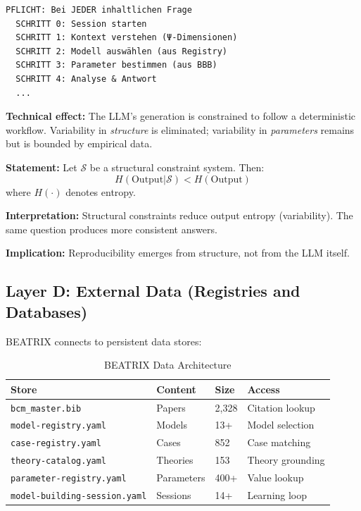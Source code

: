\begin{verbatim}
PFLICHT: Bei JEDER inhaltlichen Frage
  SCHRITT 0: Session starten
  SCHRITT 1: Kontext verstehen (Ψ-Dimensionen)
  SCHRITT 2: Modell auswählen (aus Registry)
  SCHRITT 3: Parameter bestimmen (aus BBB)
  SCHRITT 4: Analyse & Antwort
  ...
\end{verbatim}

\textbf{Technical effect:} The LLM's generation is constrained to follow a deterministic workflow. Variability in \textit{structure} is eliminated; variability in \textit{parameters} remains but is bounded by empirical data.

\begin{tcolorbox}[colback=gray!5!white, colframe=gray!75!black,
    title=Axiom BX-1: Structural Constraint]
\textbf{Statement:} Let $\mathcal{S}$ be a structural constraint system. Then:
\begin{equation}
H(\text{Output} | \mathcal{S}) < H(\text{Output})
\end{equation}
where $H(\cdot)$ denotes entropy.

\textbf{Interpretation:} Structural constraints reduce output entropy (variability). The same question produces more consistent answers.

\textbf{Implication:} Reproducibility emerges from structure, not from the LLM itself.
\end{tcolorbox}


\subsection{Layer D: External Data (Registries and Databases)}

BEATRIX connects to persistent data stores:

\begin{table}[htbp]
\centering
\caption{BEATRIX Data Architecture}
\label{tab:bx-data}
\renewcommand{\arraystretch}{1.3}
\begin{tabular}{@{}llll@{}}
\toprule
\textbf{Store} & \textbf{Content} & \textbf{Size} & \textbf{Access} \\
\midrule
\texttt{bcm\_master.bib} & Papers & 2,328 & Citation lookup \\
\texttt{model-registry.yaml} & Models & 13+ & Model selection \\
\texttt{case-registry.yaml} & Cases & 852 & Case matching \\
\texttt{theory-catalog.yaml} & Theories & 153 & Theory grounding \\
\texttt{parameter-registry.yaml} & Parameters & 400+ & Value lookup \\
\texttt{model-building-session.yaml} & Sessions & 14+ & Learning loop \\
\bottomrule
\end{tabular}
\end{table}

